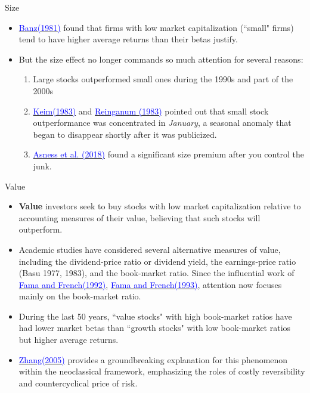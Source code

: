 \documentclass{beamer}
\begin{document}
\begin{frame}{Size}
	\begin{itemize}
		\item  \href{https://doi.org/10.1016/0304-405X(81)90018-0}{\textcolor{blue}{Banz(1981)}} found that firms with low market capitalization (``small" firms)
		tend to have higher average returns than their betas justify.
		\item But the size effect no longer commands so much attention for several reasons:
		\begin{enumerate}
			\item Large stocks outperformed small ones during the 1990s and part of the 2000s
			\item \href{https://www.sciencedirect.com/science/article/pii/0304405X83900259}{\textcolor{blue}{Keim(1983)}} and \href{https://www.sciencedirect.com/science/article/pii/0304405X83900296}{\textcolor{blue}{Reinganum (1983)}} pointed out that small stock outperformance was concentrated in \textit{January}, a seasonal anomaly that began to disappear shortly after it was publicized.
			\item \href{https://doi.org/10.1016/j.jfineco.2018.05.006}{\textcolor{blue}{Asness et al. (2018)}} found a significant size premium after you control the junk.
		\end{enumerate}
	\end{itemize}
\end{frame}


\begin{frame}{Value}
	\begin{itemize}
		\item \textbf{Value} investors seek to buy stocks with low market capitalization relative to accounting measures of their value, believing that such stocks will outperform.
		\item Academic studies have considered several alternative measures of value, including the dividend-price ratio or dividend yield, the earnings-price ratio
		(Basu 1977, 1983), and the book-market ratio. Since the influential work of \href{https://onlinelibrary.wiley.com/doi/10.1111/j.1540-6261.1992.tb04398.x}{\textcolor{blue}{Fama and French(1992)}}, \href{https://www.sciencedirect.com/science/article/pii/0304405X93900235}{\textcolor{blue}{Fama and French(1993)}}, attention now focuses mainly on the book-market ratio.
		\item During the last 50 years, ``value stocks" with high book-market ratios have had lower market betas than ``growth stocks" with low book-market ratios but higher average returns.
              \item \href{{https://www.jstor.org/stable/3694834}}{\textcolor{blue}{Zhang(2005)}} provides a groundbreaking explanation for this phenomenon within the neoclassical framework, emphasizing the roles of costly reversibility and countercyclical price of risk. 
	\end{itemize}
\end{frame}
\end{document}
